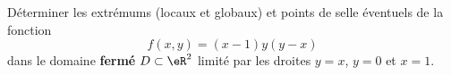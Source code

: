 
\begin{exercice}\label{exoOptimSS0006}

 Déterminer les extrémums (locaux et globaux) et points de selle éventuels de la fonction 
\begin{equation}
	f(x,y) = (x-1)y(y-x)
\end{equation}
dans le domaine {\bf fermé} $D\subset \eR^2$ limité par les droites $y=x$, $y=0$ et $x=1$. 

\end{exercice}
